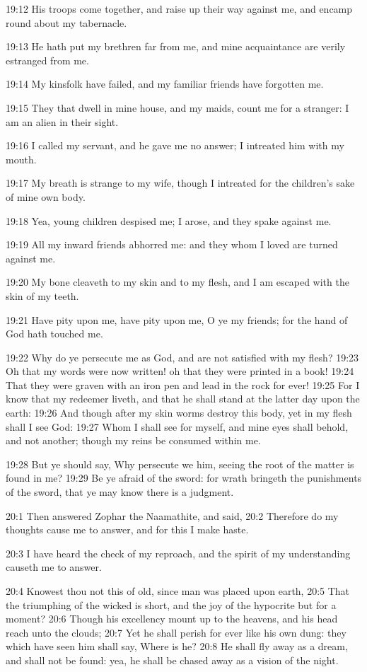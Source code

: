 19:12 His troops come together, and raise up their way against me, and encamp round about my tabernacle.

19:13 He hath put my brethren far from me, and mine acquaintance are verily estranged from me.

19:14 My kinsfolk have failed, and my familiar friends have forgotten me.

19:15 They that dwell in mine house, and my maids, count me for a stranger: I am an alien in their sight.

19:16 I called my servant, and he gave me no answer; I intreated him with my mouth.

19:17 My breath is strange to my wife, though I intreated for the children's sake of mine own body.

19:18 Yea, young children despised me; I arose, and they spake against me.

19:19 All my inward friends abhorred me: and they whom I loved are turned against me.

19:20 My bone cleaveth to my skin and to my flesh, and I am escaped with the skin of my teeth.

19:21 Have pity upon me, have pity upon me, O ye my friends; for the hand of God hath touched me.

19:22 Why do ye persecute me as God, and are not satisfied with my flesh?  19:23 Oh that my words were now written! oh that they were printed in a book!  19:24 That they were graven with an iron pen and lead in the rock for ever!  19:25 For I know that my redeemer liveth, and that he shall stand at the latter day upon the earth: 19:26 And though after my skin worms destroy this body, yet in my flesh shall I see God: 19:27 Whom I shall see for myself, and mine eyes shall behold, and not another; though my reins be consumed within me.

19:28 But ye should say, Why persecute we him, seeing the root of the matter is found in me?  19:29 Be ye afraid of the sword: for wrath bringeth the punishments of the sword, that ye may know there is a judgment.

20:1 Then answered Zophar the Naamathite, and said, 20:2 Therefore do my thoughts cause me to answer, and for this I make haste.

20:3 I have heard the check of my reproach, and the spirit of my understanding causeth me to answer.

20:4 Knowest thou not this of old, since man was placed upon earth, 20:5 That the triumphing of the wicked is short, and the joy of the hypocrite but for a moment?  20:6 Though his excellency mount up to the heavens, and his head reach unto the clouds; 20:7 Yet he shall perish for ever like his own dung: they which have seen him shall say, Where is he?  20:8 He shall fly away as a dream, and shall not be found: yea, he shall be chased away as a vision of the night.


